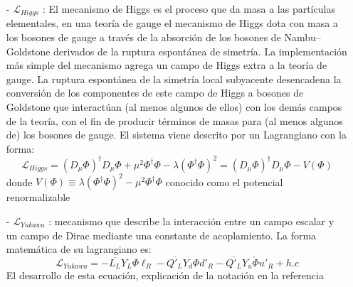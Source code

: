 \begin{itemize}
\item[-] $\mathcal{L}_{Higgs}$ : El mecanismo de Higgs es el proceso que da masa a las partículas elementales, en una teoría de gauge el mecanismo de Higgs dota con masa a los bosones de gauge a través de la absorción de los bosones de Nambu–Goldstone derivados de la ruptura espontánea de simetría. La implementación más simple del mecanismo agrega un campo de Higgs extra a la teoría de gauge. La ruptura espontánea de la simetría local subyacente desencadena la conversión de los componentes de este campo de Higgs a bosones de Goldstone que interactúan (al menos algunos de ellos) con los demás campos de la teoría, con el fin de producir términos de masas para (al menos algunos de) los bosones de gauge. El sistema viene descrito por un Lagrangiano con la forma:
\begin{equation}
\mathcal{L}_{Higgs} = 
(D_\mu \Phi)^\dagger D_\mu \Phi +
\mu^2 \Phi^\dagger \Phi -
\lambda (\Phi^\dagger \Phi)^2 = (D_\mu \Phi)^\dagger D_\mu \Phi - V(\Phi)
\end{equation}
donde $V(\Phi) \equiv \lambda (\Phi^\dagger \Phi)^2 - \mu^2 \Phi^\dagger \Phi$ conocido como el potencial renormalizable
\item[-] $\mathcal{L}_{Yukawa}$ : mecanismo que describe la interacción entre un campo escalar y un campo de Dirac mediante una constante de acoplamiento. La forma matemática de su lagrangiano es:
\begin{equation}
\mathcal{L}_{Yukawa} = -
\overline{L_L} Y_L \Phi \ell_R -
\overline{Q'_L} Y_d \Phi d'_R -
\overline{Q'_L}Y_u \acute{\Phi}u'_R + h.c
\end{equation}
El desarrollo de esta ecuación, explicación de la notación en la referencia \citep{santamaria_masses_1993, romao_resource_2012}


\end{itemize}

